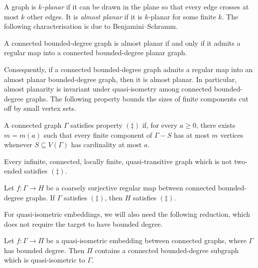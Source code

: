 \documentclass[a4paper]{amsart}
\begin{document}
A graph is \emph{$k$-planar} if it can be drawn in the plane so that every edge crosses at most $k$ other edges.
It is \emph{almost planar} if it is $k$-planar for some finite $k$.
The following characterisation is due to Benjamini--Schramm.

\begin{theorem}\label{thm:almost-planar-regular}
A connected bounded-degree graph is almost planar if and only if it admits a regular map into a connected bounded-degree planar graph.
\end{theorem}

Consequently, if a connected bounded-degree graph admits a regular map into an almost planar bounded-degree graph, then it is almost planar.
In particular, almost planarity is invariant under quasi-isometry among connected bounded-degree graphs.
The following property bounds the sizes of finite components cut off by small vertex sets.


\begin{definition}\label{def:ddagger}
A connected graph $\Gamma$ satisfies property $(\ddagger)$ if, for every $a\geq0$, there exists $m=m(a)$ such that every finite component of $\Gamma-S$ has at most $m$ vertices whenever $S\subseteq V(\Gamma)$ has cardinality at most $a$.
\end{definition}

\begin{lemma}\label{lem:quasi-transitive-ddagger}
Every infinite, connected, locally finite, quasi-transitive graph which is not two-ended satisfies $(\ddagger)$.
\end{lemma}

\begin{lemma}\label{lem:regular-ddagger}
Let $f:\Gamma\to H$ be a coarsely surjective regular map between connected bounded-degree graphs.
If $\Gamma$ satisfies $(\ddagger)$, then $H$ satisfies $(\ddagger)$.
\end{lemma}

For quasi-isometric embeddings, we will also need the following reduction, which does not require the target to have bounded degree.

\begin{lemma}\label{lem:bounded-degree-qi-image}
Let $f:\Gamma\to\Pi$ be a quasi-isometric embedding between connected graphs, where $\Gamma$ has bounded degree.
Then $\Pi$ contains a connected bounded-degree subgraph which is quasi-isometric to $\Gamma$.
\end{lemma}
\end{document}
